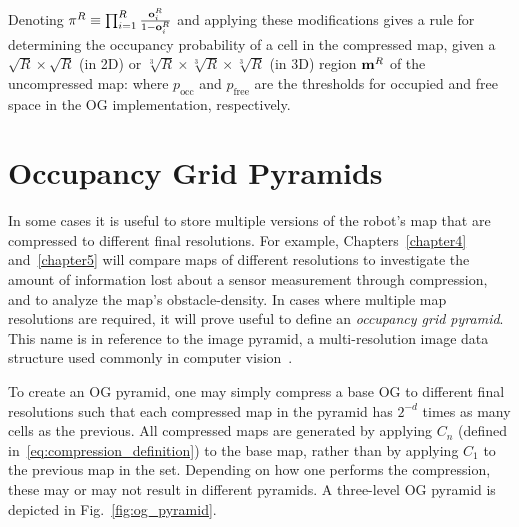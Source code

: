 Denoting $\pi^{R} \equiv
\prod_{i=1}^{R}\frac{\mathbf{o}_{i}^{R}}{1-\mathbf{o}_{i}^{R}}$ and applying
these modifications gives a rule for determining the occupancy probability of a
cell in the compressed map, given a $\sqrt{R}\times\sqrt{R}$ (in 2D) or
$\sqrt[3]{R}\times\sqrt[3]{R}\times\sqrt[3]{R}$ (in 3D) region $\mathbf{m}^{R}$ of
the uncompressed
map:
%
%
where $p_{\text{occ}}$ and $p_{\text{free}}$ are the thresholds for occupied and free space in the OG implementation, respectively.

\section{Occupancy Grid Pyramids}
\label{sec:og_pyramid}

In some cases it is useful to store multiple versions of the robot's map that are compressed
to different final resolutions. For example, Chapters~\ref{chapter4}
and~\ref{chapter5} will compare maps of different resolutions to
investigate the amount of information lost about a sensor measurement through
compression, and to analyze the map's obstacle-density. In cases where
multiple map resolutions are required, it will prove useful to define an
\textit{occupancy grid pyramid}. This name is in reference to the image pyramid,
a multi-resolution image data structure used commonly in computer vision~\cite{adelson1984pyramid}.

To create an OG pyramid, one may simply compress a base OG to different final
resolutions such that each compressed map in the pyramid has $2^{-d}$ times as many
cells as the previous.
%
%
All compressed maps are generated by applying $C_{n}$
(defined in~\eqref{eq:compression_definition})
to the base map, rather than by applying $C_{1}$ to the previous map in the
set. Depending on how one performs the compression, these may or may not result in
different pyramids.
A three-level OG pyramid is depicted in Fig.~\ref{fig:og_pyramid}.

